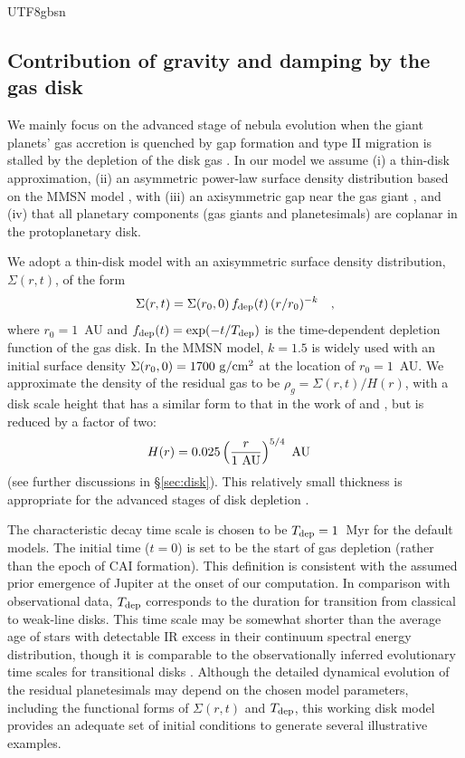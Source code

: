 \documentclass[tighten]{aastex6}
\begin{document}
\begin{CJK*}{UTF8}{gbsn}
\subsection{Contribution of gravity and damping by the gas disk}

We mainly focus on the advanced stage of nebula evolution when 
the giant planets' gas accretion is quenched by gap formation
and type II migration is stalled by the depletion of the disk
gas \citep{lin1986, dobbs2007}. In our model we assume (i) a thin-disk 
approximation, (ii) an asymmetric power-law surface density distribution 
based on the MMSN model \citep{hayashi1981}, 
with (iii)  an axisymmetric gap near the gas giant \citep{bryden1999},  and  (iv) that all planetary components (gas giants and planetesimals) are coplanar in the protoplanetary disk.

We adopt a thin-disk model with an axisymmetric surface density distribution, $\Sigma(r,t)$, of the form
% 
\begin{equation}
\Sigma(r,t) = \Sigma(r_0,0) \, f_{\rm dep}(t) \, (r/r_{0})^{-k} \quad ,
\label{eq:sigma}
\end{equation}
%
where $r_0=1$~AU and $f_{\rm dep}(t) = {\rm exp} (- t/T_{\rm dep})$ is the 
time-dependent depletion function of the gas disk. In the MMSN model, $k = 1.5$ is widely used with an initial surface density $\Sigma(r_0,0) = 1700~\rm{g/cm^{2}}$ at the location of $r_0=1$~AU.
%
We approximate the density of the residual gas
to be $\rho_{g} = \Sigma (r, t) / H (r)$, with a disk scale height 
that has a similar form to that in the work of \cite{hayashi1981} 
and \cite{thommes2008}, but is reduced by a factor of two: 
%
\begin{equation}
H(r) = 0.025 \left(\frac{r}{1~{\rm AU}}\right)^{5/4}\ {\rm AU} \quad 
\end{equation}
%
(see further discussions in \S\ref{sec:disk}).
This relatively small thickness is appropriate for the advanced stages
of disk depletion \citep{garaudlin2007}.

The characteristic decay time scale is chosen to be $T_{\rm dep}= 1$~Myr 
for the default models. The initial time ($t = 0$) is set to be the start 
of gas depletion (rather than the epoch of CAI formation). This definition 
is consistent with the assumed prior emergence of Jupiter at the onset of 
our computation.  In comparison with observational data, $T_{\rm dep}$ 
corresponds to the duration for transition from classical to weak-line 
disks. This time scale may be somewhat shorter than the average age of 
stars with detectable IR excess in their continuum spectral energy 
distribution, though it is comparable to the observationally inferred 
evolutionary time scales for transitional disks
\citep{currie2011}.  
Although the detailed dynamical evolution of the 
residual planetesimals may depend on the chosen model parameters, 
including the functional forms of $\Sigma(r,t)$ and $T_{\rm dep}$, 
this working disk model provides an adequate set of initial conditions 
to generate several illustrative examples.  


\end{CJK*}
\end{document}
